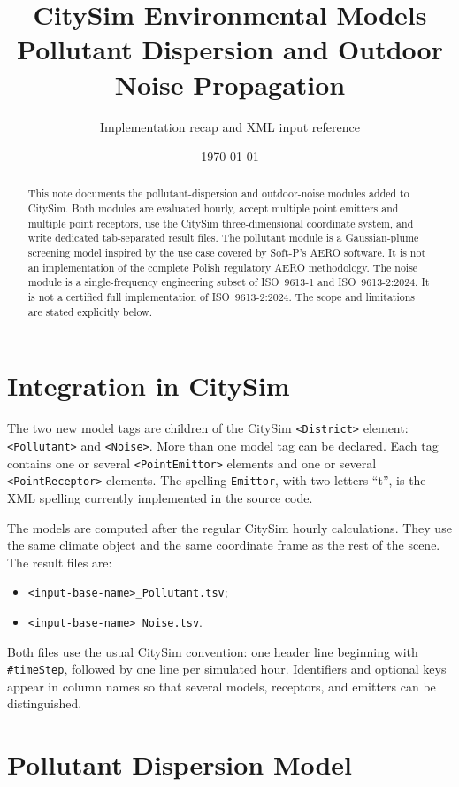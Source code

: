 \documentclass[11pt,a4paper]{article}
\title{CitySim Environmental Models\\
       Pollutant Dispersion and Outdoor Noise Propagation}
\author{Implementation recap and XML input reference}
\date{\today}
\newcommand{\code}[1]{\texttt{#1}}
\begin{document}
\maketitle

\begin{abstract}
This note documents the pollutant-dispersion and outdoor-noise modules added to
CitySim. Both modules are evaluated hourly, accept multiple point emitters and
multiple point receptors, use the CitySim three-dimensional coordinate system,
and write dedicated tab-separated result files. The pollutant module is a
Gaussian-plume screening model inspired by the use case covered by Soft-P's
AERO software. It is not an implementation of the complete Polish regulatory
AERO methodology. The noise module is a single-frequency engineering subset of
ISO~9613-1 and ISO~9613-2:2024. It is not a certified full implementation of
ISO~9613-2:2024. The scope and limitations are stated explicitly below.
\end{abstract}

\tableofcontents

\section{Integration in CitySim}

The two new model tags are children of the CitySim \code{<District>} element:
\code{<Pollutant>} and \code{<Noise>}. More than one model tag can be declared.
Each tag contains one or several \code{<PointEmittor>} elements and one or
several \code{<PointReceptor>} elements. The spelling \code{Emittor}, with two
letters ``t'', is the XML spelling currently implemented in the source code.

The models are computed after the regular CitySim hourly calculations. They use
the same climate object and the same coordinate frame as the rest of the scene.
The result files are:
\begin{itemize}
  \item \code{<input-base-name>\_Pollutant.tsv};
  \item \code{<input-base-name>\_Noise.tsv}.
\end{itemize}

Both files use the usual CitySim convention: one header line beginning with
\code{\#timeStep}, followed by one line per simulated hour. Identifiers and
optional keys appear in column names so that several models, receptors, and
emitters can be distinguished.

\section{Pollutant Dispersion Model}
\end{document}
